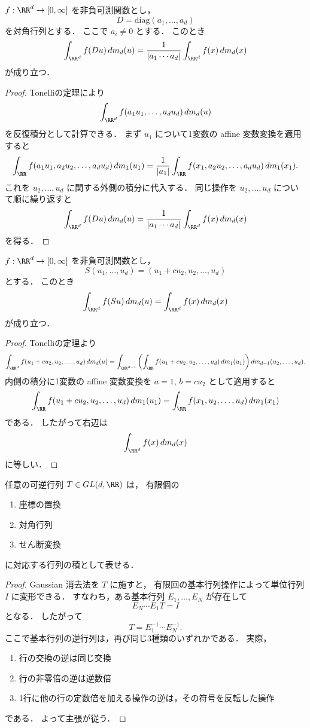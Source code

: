 \begin{lemma}[対角行列]
$f:\RR^d\to[0,\infty]$ を非負可測関数とし，
\[
D=\mathrm{diag}(a_1,\dots,a_d)
\]
を対角行列とする．
ここで $a_i\ne 0$ とする．
このとき
\[
\int_{\RR^d}f(Du)\,dm_d(u)
=
\frac{1}{|a_1\cdots a_d|}\int_{\RR^d}f(x)\,dm_d(x)
\]
が成り立つ．
\end{lemma}
\begin{proof}
Tonelliの定理により
\[
\int_{\RR^d}f(a_1u_1,\dots,a_du_d)\,dm_d(u)
\]
を反復積分として計算できる．
まず $u_1$ について1変数の affine 変数変換を適用すると
\begin{align*}
\int_{\RR}f(a_1u_1,a_2u_2,\dots,a_du_d)\,dm_1(u_1)
=
\frac1{|a_1|}
\int_{\RR}f(x_1,a_2u_2,\dots,a_du_d)\,dm_1(x_1).
\end{align*}
これを $u_2,\dots,u_d$ に関する外側の積分に代入する．
同じ操作を $u_2,\dots,u_d$ について順に繰り返すと
\[
\int_{\RR^d}f(Du)\,dm_d(u)
=
\frac{1}{|a_1\cdots a_d|}\int_{\RR^d}f(x)\,dm_d(x)
\]
を得る．
\end{proof}

\begin{lemma}[せん断変換]
$f:\RR^d\to[0,\infty]$ を非負可測関数とし，
\[
S(u_1,\dots,u_d)=(u_1+cu_2,u_2,\dots,u_d)
\]
とする．
このとき
\[
\int_{\RR^d}f(Su)\,dm_d(u)=\int_{\RR^d}f(x)\,dm_d(x)
\]
が成り立つ．
\end{lemma}
\begin{proof}
Tonelliの定理より
\begin{align*}
\int_{\RR^d}f(u_1+cu_2,u_2,\dots,u_d)\,dm_d(u)
=
\int_{\RR^{d-1}}
\left(
\int_{\RR}f(u_1+cu_2,u_2,\dots,u_d)\,dm_1(u_1)
\right)
dm_{d-1}(u_2,\dots,u_d).
\end{align*}
内側の積分に1変数の affine 変数変換を $a=1$, $b=cu_2$ として適用すると
\[
\int_{\RR}f(u_1+cu_2,u_2,\dots,u_d)\,dm_1(u_1)
=
\int_{\RR}f(x_1,u_2,\dots,u_d)\,dm_1(x_1)
\]
である．
したがって右辺は
\[
\int_{\RR^d}f(x)\,dm_d(x)
\]
に等しい．
\end{proof}

\begin{proposition}[可逆行列の分解]
任意の可逆行列 $T\in GL(d,\RR)$ は，
有限個の
\begin{enumerate}
    \item 座標の置換
    \item 対角行列
    \item せん断変換
\end{enumerate}
に対応する行列の積として表せる．
\end{proposition}
\begin{proof}
Gaussian 消去法を $T$ に施すと，
有限回の基本行列操作によって単位行列 $I$ に変形できる．
すなわち，ある基本行列 $E_1,\dots,E_N$ が存在して
\[
E_N\cdots E_1T=I
\]
となる．
したがって
\[
T=E_1^{-1}\cdots E_N^{-1}.
\]
ここで基本行列の逆行列は，再び同じ3種類のいずれかである．
実際，
\begin{enumerate}
    \item 行の交換の逆は同じ交換
    \item 行の非零倍の逆は逆数倍
    \item 1行に他の行の定数倍を加える操作の逆は，その符号を反転した操作
\end{enumerate}
である．
よって主張が従う．
\end{proof}

